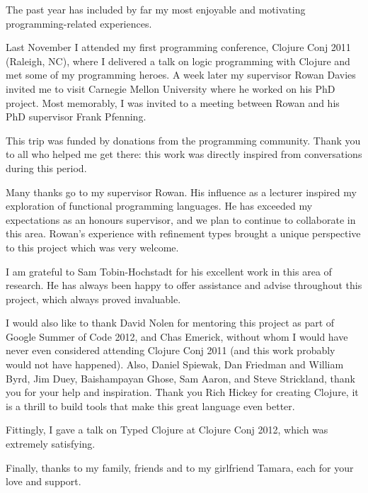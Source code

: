 \documentclass{cshonours}
\begin{document}
\begin{acknowledgements}

The past year has included by far my most enjoyable and motivating programming-related experiences.

Last November I attended my first programming conference, Clojure Conj 2011 (Raleigh, NC),
where I delivered a talk on logic programming with Clojure and met some of my programming heroes.
A week later my supervisor Rowan Davies invited me to visit Carnegie Mellon University
where he worked on his PhD project. Most memorably, I was invited to a meeting between
Rowan and his PhD supervisor Frank Pfenning.

This trip was funded by donations from the programming community. Thank you to all who helped me get there:
this work was directly inspired from conversations during this period.

Many thanks go to my supervisor Rowan. His influence as a lecturer inspired my exploration of
functional programming languages. He has exceeded my expectations as an honours supervisor,
and we plan to continue to collaborate in this area.
Rowan's experience with refinement types brought a unique perspective to this project
which was very welcome.

I am grateful to Sam Tobin-Hochstadt for his excellent work in this area of research.
He has always been happy to offer assistance and advise throughout this project, which always proved invaluable.

I would also like to thank David Nolen for mentoring this project as part of Google Summer of Code 2012,
and Chas Emerick, without whom I would have never even considered attending Clojure Conj 2011
(and this work probably would not have happened).
Also, Daniel Spiewak, Dan Friedman and William Byrd, Jim Duey, Baishampayan Ghose, Sam Aaron, and
Steve Strickland, thank you for your help and inspiration.
Thank you Rich Hickey for creating Clojure, it is a thrill to build tools that make
this great language even better.

Fittingly, I gave a talk on Typed Clojure at Clojure Conj 2012, which was extremely satisfying.

Finally, thanks to my family, friends and to my girlfriend Tamara, each for your love and support.

\end{acknowledgements}

\tableofcontents




\end{document}
